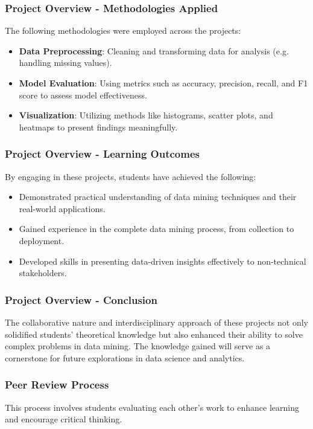\documentclass[aspectratio=169]{beamer}
\begin{document}
\begin{frame}[fragile]
    \frametitle{Project Overview - Methodologies Applied}
    The following methodologies were employed across the projects:
    
    \begin{itemize}
        \item \textbf{Data Preprocessing}: Cleaning and transforming data for analysis (e.g. handling missing values).
        
        \item \textbf{Model Evaluation}: Using metrics such as accuracy, precision, recall, and F1 score to assess model effectiveness.
        
        \item \textbf{Visualization}: Utilizing methods like histograms, scatter plots, and heatmaps to present findings meaningfully.
    \end{itemize}
\end{frame}

\begin{frame}[fragile]
    \frametitle{Project Overview - Learning Outcomes}
    By engaging in these projects, students have achieved the following:
    
    \begin{itemize}
        \item Demonstrated practical understanding of data mining techniques and their real-world applications.
        \item Gained experience in the complete data mining process, from collection to deployment.
        \item Developed skills in presenting data-driven insights effectively to non-technical stakeholders.
    \end{itemize}
\end{frame}

\begin{frame}[fragile]
    \frametitle{Project Overview - Conclusion}
    The collaborative nature and interdisciplinary approach of these projects not only solidified students' theoretical knowledge but also enhanced their ability to solve complex problems in data mining. 
    The knowledge gained will serve as a cornerstone for future explorations in data science and analytics.
\end{frame}

\begin{frame}[fragile]
    \frametitle{Peer Review Process}
    This process involves students evaluating each other's work to enhance learning and encourage critical thinking.
\end{frame}
\end{document}
